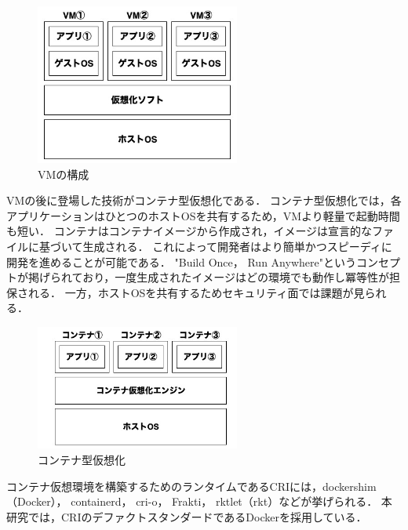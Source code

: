 \begin{figure}[htbp]
\begin{center}
    \includegraphics[width=0.6\textwidth]{./figures/vm-structure.jpg}
    \caption{VMの構成}
\end{center}
\end{figure}

VMの後に登場した技術がコンテナ型仮想化である．
コンテナ型仮想化では，各アプリケーションはひとつのホストOSを共有するため，VMより軽量で起動時間も短い．
コンテナはコンテナイメージから作成され，イメージは宣言的なファイルに基づいて生成される．
これによって開発者はより簡単かつスピーディに開発を進めることが可能である．
"Build Once， Run Anywhere"というコンセプトが掲げられており，一度生成されたイメージはどの環境でも動作し冪等性が担保される．
一方，ホストOSを共有するためセキュリティ面では課題が見られる．

\begin{figure}[htbp]
\begin{center}
    \includegraphics[width=0.6\textwidth]{./figures/docker-structure.jpg}
    \caption{コンテナ型仮想化}
\end{center}
\end{figure}

コンテナ仮想環境を構築するためのランタイムであるCRIには，dockershim（Docker）， containerd， cri-o， Frakti， rktlet（rkt）などが挙げられる．
本研究では，CRIのデファクトスタンダードであるDockerを採用している．

